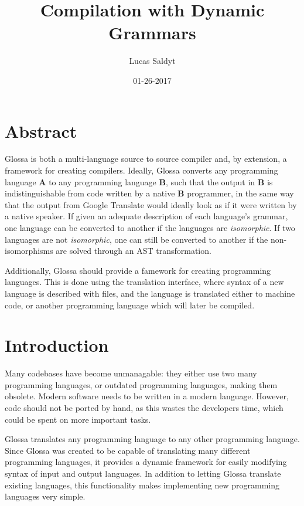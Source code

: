 \documentclass{article}
\title{Compilation with Dynamic Grammars}
\date{01-26-2017}
\author{Lucas Saldyt}
\begin{document}
\maketitle
{}
\newpage
{}

\section{Abstract}
Glossa is both a multi-language source to source compiler and, by extension, a framework for creating compilers.
Ideally, Glossa converts any programming language \textbf{A} to any programming language \textbf{B}, such that the output in \textbf{B} is indistinguishable from code written by a native \textbf{B} programmer, in the same way that the output from Google Translate would ideally look as if it were written by a native speaker.
If given an adequate description of each language's grammar, one language can be converted to another if the languages are \textit{isomorphic}.
If two languages are not \textit{isomorphic}, one can still be converted to another if the non-isomorphisms are solved through an AST transformation.

Additionally, Glossa should provide a famework for creating programming languages.
This is done using the translation interface, where syntax of a new language is described with files, and the language is translated either to machine code, or another programming language which will later be compiled.

\section{Introduction}

Many codebases have become unmanagable: they either use two many programming languages, or outdated programming languages, making them obsolete.
Modern software needs to be written in a modern language. However, code should not be ported by hand, as this wastes the developers time, which could be spent on more important tasks.

Glossa translates any programming language to any other programming language.
Since Glossa was created to be capable of translating many different programming languages, it provides a dynamic framework for easily modifying syntax of input and output languages. 
In addition to letting Glossa translate existing languages, this functionality makes implementing new programming languages very simple.
\end{document}
